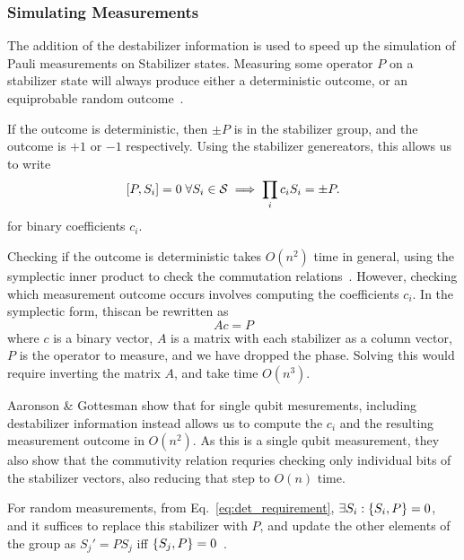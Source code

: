 \subsubsection*{Simulating Measurements}
The addition of the destabilizer information is  used to speed up the simulation of Pauli measurements on Stabilizer states. Measuring some operator $P$ on a stabilizer state will always produce either a deterministic outcome, or an equiprobable random outcome~\cite{Gottesman1998b}.\par
If the outcome is deterministic, then $\pm P$ is in the stabilizer group, and the outcome is $+1$ or $-1$ respectively. Using the stabilizer genereators, this allows us to write 
\begin{equation}
    \comm{P}{S_{i}}=0\;\forall S_{i}\in\mathcal{S} \implies \prod_{i}c_{i}S_{i} = \pm P. \label{eq:det_requirement}
\end{equation}
for binary coefficients $c_{i}$.\par
Checking if the outcome is deterministic takes $O(n^{2})$ time in general, using the symplectic inner product to check the commutation relations~\cite{Dehaene2003}. However, checking which measurement outcome occurs involves computing the coefficients $c_{i}$. In the symplectic form, thiscan be rewritten as
\[
    Ac=P
\]
where $c$ is a binary vector, $A$ is a matrix with each stabilizer as a column vector, $P$ is the operator to measure, and we have dropped the phase. Solving this would require inverting the matrix $A$, and take time $O(n^{3})$.\par
Aaronson \& Gottesman show that for single qubit mesurements, including destabilizer information instead allows us to compute the $c_{i}$ and the resulting measurement outcome in $O(n^{2})$. As this is a single qubit measurement, they also show that the commutivity relation requries checking only individual bits of the stabilizer vectors, also reducing that step to $O(n)$ time.\par
For random measurements, from Eq.~\ref{eq:det_requirement}, $\exists S_{i}:\acomm{S_{i}}{P}=0$, and it suffices to replace this stabilizer with $P$, and update the other elements of the group as $S_{j}'=PS_{j}$ iff $\acomm{S_{j}}{P}=0$~\cite{Gottesman1998b,Aaronson2004}.
